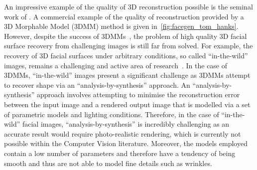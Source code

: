 An impressive example of the quality of 3D reconstruction possible is the
seminal work of \citet{RefWorks:96}. A commercial example of the
quality of reconstruction provided by a 3D Morphable Model (3DMM) method
is given in~\cref{fig:facegen_tom_hanks}. However, despite the success of 
3DMMs~\cite{RefWorks:96}, the problem of high quality 3D facial 
surface recovery from challenging images is still far from solved. For example,
the recovery of 3D facial surfaces under arbitrary conditions,
so called ``in-the-wild'' images, remains a challenging and active area of
research~\cite{KemelmacherShlizerman:2013iv,Suwajanakorn:2015gf,Suwajanakorn:2014bl,Snape:2015gl,Roth:2015hq}.
In the case of 3DMMs, ``in-the-wild'' images present a significant challenge
as 3DMMs attempt to recover shape via an ``analysis-by-synthesis'' approach. An
``analysis-by-synthesis'' approach involves attempting to minimise the 
reconstruction error between the input image and a rendered output image that
is modelled via a set of parametric models and lighting conditions. Therefore,
in the case of ``in-the-wild'' facial images, ``analysis-by-synthesis'' is
incredibly challenging as an accurate result would require photo-realistic
rendering, which is currently not possible within the Computer Vision
literature. Moreover, the models employed contain a low number
of parameters and therefore have a tendency of being smooth and thus are not 
able to model fine details such as wrinkles.


